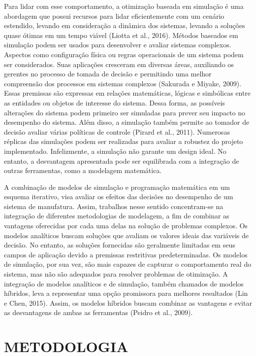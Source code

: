 \documentclass[
]{book}
\begin{document}
Para lidar com esse comportamento, a otimização baseada em simulação é uma abordagem que possui recursos para lidar eficientemente com um cenário estendido, levando em consideração a dinâmica dos sistemas, levando a soluções quase ótimas em um tempo viável (Liotta et al., 2016). Métodos baseados em simulação podem ser usados para desenvolver e avaliar sistemas complexos. Aspectos como configuração física ou regras operacionais de um sistema podem ser considerados. Suas aplicações cresceram em diversas áreas, auxiliando os gerentes no processo de tomada de decisão e permitindo uma melhor compreensão dos processos em sistemas complexos (Sakurada e Miyake, 2009). Essas premissas são expressas em relações matemáticas, lógicas e simbólicas entre as entidades ou objetos de interesse do sistema. Dessa forma, as possíveis alterações do sistema podem primeiro ser simuladas para prever seu impacto no desempenho do sistema. Além disso, a simulação também permite ao tomador de decisão avaliar várias políticas de controle (Pirard et al., 2011). Numerosas réplicas das simulações podem ser realizadas para avaliar a robustez do projeto implementado. Infelizmente, a simulação não garante um design ideal. No entanto, a desvantagem apresentada pode ser equilibrada com a integração de outras ferramentas, como a modelagem matemática.

A combinação de modelos de simulação e programação matemática em um esquema iterativo, visa avaliar os efeitos das decisões no desempenho de um sistema de manufatura. Assim, trabalhos nesse sentido concentram-se na integração de diferentes metodologias de modelagem, a fim de combinar as vantagens oferecidas por cada uma delas na solução de problemas complexos. Os modelos analíticos buscam soluções que avaliam os valores ideais das variáveis de decisão. No entanto, as soluções fornecidas são geralmente limitadas em seus campos de aplicação devido a premissas restritivas predeterminadas. Os modelos de simulação, por sua vez, são mais capazes de capturar o comportamento real do sistema, mas não são adequados para resolver problemas de otimização. A integração de modelos analíticos e de simulação, também chamados de modelos híbridos, leva a representar uma opção promissora para melhores resultados (Lin e Chen, 2015). Assim, os modelos híbridos buscam combinar as vantagens e evitar as desvantagens de ambas as ferramentas (Peidro et al., 2009).

\hypertarget{metodologia}{%
\chapter{METODOLOGIA}\label{metodologia}}
\end{document}
